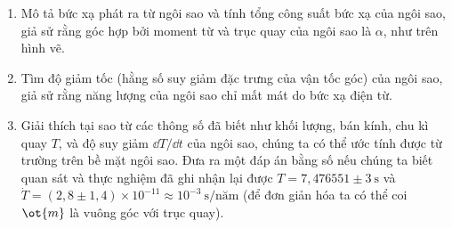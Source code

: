 \begin{vd}
\begin{center}
\end{center}

\begin{enumerate}[1)]
  \item Mô tả bức xạ phát ra từ ngôi sao và tính tổng công suất bức xạ của ngôi sao, giả sử rằng góc hợp bởi moment từ và trục quay của ngôi sao là $\alpha$, như trên hình vẽ. 
  \item Tìm độ giảm tốc (hằng số suy giảm đặc trưng của vận tốc góc) của ngôi sao, giả sử rằng năng lượng của ngôi sao chỉ mất mát do bức xạ điện từ.
  \item Giải thích tại sao từ các thông số đã biết như khối lượng, bán kính, chu kì quay $T$, và độ suy giảm $\dd T/ \dd t$ của ngôi sao, chúng ta có thể ước tính được từ trường trên bề mặt ngôi sao. Đưa ra một đáp án bằng số nếu chúng ta biết quan sát và thực nghiệm đã ghi nhận lại được $T= 7,476551 \pm 3 ~\mathrm{s}$ và $\dot{T} = (2,8 \pm 1,4)\times 10^{-11} \approx 10^{-3} ~\mathrm{s/}\text{năm}$ (để đơn giản hóa ta có thể coi $\ot{m}$ là vuông góc với trục quay).

\end{enumerate}
\end{vd}

